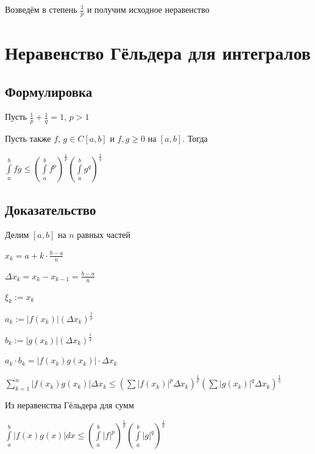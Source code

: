 \documentclass{article}
\begin{document}
            Возведём в степень $\frac{1}{p}$ и получим исходное неравенство
            
    \newpage
    
    \section{Неравенство Гёльдера для интегралов}
    
        \subsection{Формулировка}
        
            Пусть $\frac{1}{p} + \frac{1}{q} = 1$, $p > 1$
            
            Пусть также $f$, $g \in C[a, b]$ и $f, g \geq 0$ на $[a, b]$. Тогда
            
            $\int\limits^b_a fg \leq \left(\int\limits^b_a f^p\right)^{\frac{1}{p}} \left(\int\limits^b_a g^q\right)^{\frac{1}{q}}$
            
        \subsection{Доказательство}
        
            Делим $[a, b]$ на $n$ равных частей
            
            $x_k = a + k \cdot \frac{b - a}{n}$  
            
            $\Delta x_k = x_k - x_{k - 1} = \frac{b - a}{n}$
            
            $\xi_k := x_k$
            
            $a_k := |f(x_k)|(\Delta x_k)^{\frac{1}{p}}$
            
            $b_k := |g(x_k)|(\Delta x_k)^{\frac{1}{q}}$
            
            $a_k \cdot b_k = |f(x_k)g(x_k)| \cdot \Delta x_k$
            
            $\sum\limits_{k = 1}^n |f(x_k) g(x_k)| \Delta x_k \leq (\sum |f(x_k)|^p \Delta x_k)^{\frac{1}{p}}(\sum|g(x_k)|^q \Delta x_k)^{\frac{1}{q}}$
            
            Из неравенства Гёльдера для сумм
            
            $\int\limits^b_a |f(x) g(x)| dx \leq (\int\limits^b_a |f|^p)^{\frac{1}{p}}(\int\limits^b_a |g|^q)^{\frac{1}{q}}$
            
    \newpage
    
\end{document}
